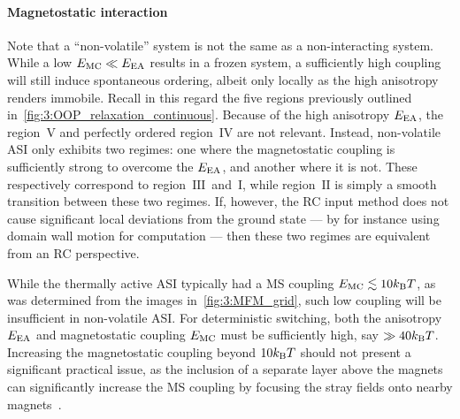 \paragraph{Magnetostatic interaction}
Note that a ``non-volatile'' system is not the same as a non-interacting system.
While a low  $E_\mathrm{MC} \ll E_\mathrm{EA}$ results in a frozen system, a sufficiently high coupling will still induce spontaneous ordering, albeit only locally as the high anisotropy renders  immobile.
Recall in this regard the five regions previously outlined in~\cref{fig:3:OOP_relaxation_continuous}.
Because of the high anisotropy $E_\mathrm{EA}$, the  region~$\mathrm{V}$ and perfectly ordered region~$\mathrm{IV}$ are not relevant.
Instead, non-volatile ASI only exhibits two regimes: one where the magnetostatic coupling is sufficiently strong to overcome the  $E_\mathrm{EA}$, and another where it is not.
These respectively correspond to region~$\mathrm{III}$~and~$\mathrm{I}$, while region~$\mathrm{II}$ is simply a smooth transition between these two regimes.
If, however, the RC input method does not cause significant local deviations from the ground state --- by for instance using domain wall motion for computation --- then these two regimes are equivalent from an RC perspective. \par


While the thermally active ASI typically had a MS coupling $\EMC \lesssim 10\kBT$, as was determined from the  images in~\cref{fig:3:MFM_grid}, such low coupling will be insufficient in non-volatile ASI.
For deterministic switching, both the anisotropy $E_\mathrm{EA}$ and magnetostatic coupling $E_\mathrm{MC}$ must be sufficiently high, say $\gg 40 \kBT$.
Increasing the magnetostatic coupling beyond $10\kBT$ should not present a significant practical issue, as the inclusion of a separate  layer above the magnets can significantly increase the MS coupling by focusing the stray fields onto nearby magnets~\cite[Supp. 10]{KUR-24}.

